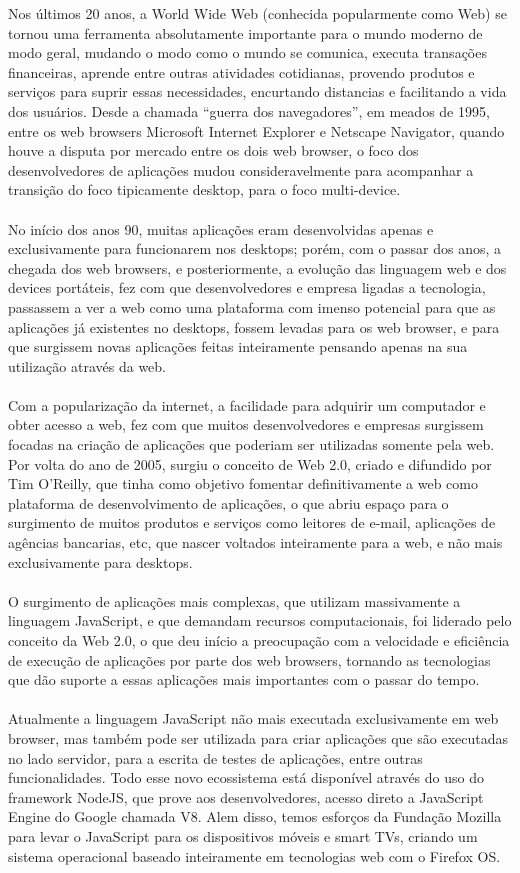 \documentclass[12pt,a4paper]{article}
\begin{document}
Nos últimos 20 anos, a World Wide Web (conhecida popularmente como Web) se tornou uma ferramenta absolutamente importante para o mundo moderno de modo geral, mudando o modo como o mundo se comunica, executa transações financeiras, aprende entre outras atividades cotidianas, provendo produtos e serviços para suprir essas necessidades, encurtando distancias e facilitando a vida dos usuários. Desde a chamada “guerra dos navegadores”, em meados de 1995, entre os web browsers Microsoft Internet Explorer e Netscape Navigator, quando houve a disputa por mercado entre os dois web browser, o foco dos desenvolvedores de aplicações mudou consideravelmente para acompanhar a transição do foco tipicamente desktop, para o foco multi-device. \\
\\
No início dos anos 90, muitas aplicações eram desenvolvidas apenas e exclusivamente para funcionarem nos desktops; porém, com o passar dos anos, a chegada dos web browsers, e posteriormente, a evolução das linguagem web e dos devices portáteis, fez com que desenvolvedores e empresa ligadas a tecnologia, passassem a ver a web como uma plataforma com imenso potencial para que as aplicações já existentes no desktops, fossem levadas para os web browser, e para que surgissem novas aplicações feitas inteiramente pensando apenas na sua utilização através da web. \\
\\
Com a popularização da internet, a facilidade para adquirir um computador e obter acesso a web, fez com que muitos desenvolvedores e empresas surgissem focadas na criação de aplicações que poderiam ser utilizadas somente pela web. Por volta do ano de 2005, surgiu o conceito de Web 2.0, criado e difundido por Tim O'Reilly, que tinha como objetivo fomentar definitivamente a web como plataforma de desenvolvimento de aplicações, o que abriu espaço para o surgimento de muitos produtos e serviços como leitores de e-mail, aplicações de agências bancarias, etc, que nascer voltados inteiramente para a web, e não mais exclusivamente para desktops. \\
\\
O surgimento de aplicações mais complexas, que utilizam massivamente a linguagem JavaScript, e que demandam recursos computacionais, foi liderado pelo conceito da Web 2.0, o que deu início a preocupação com a velocidade e eficiência de execução de aplicações por parte dos web browsers, tornando as tecnologias que dão suporte a essas aplicações mais importantes com o passar do tempo. \\
\\
Atualmente a linguagem JavaScript não mais executada exclusivamente em web browser, mas também pode ser utilizada para criar aplicações que são executadas no lado servidor, para a escrita de testes de aplicações, entre outras funcionalidades. Todo esse novo ecossistema está disponível através do uso do framework NodeJS, que prove aos desenvolvedores, acesso direto a JavaScript Engine do Google chamada V8. Alem disso, temos esforços da Fundação Mozilla para levar o JavaScript para os dispositivos móveis e smart TVs, criando um sistema operacional baseado inteiramente em tecnologias web com o
Firefox OS.
\end{document}
